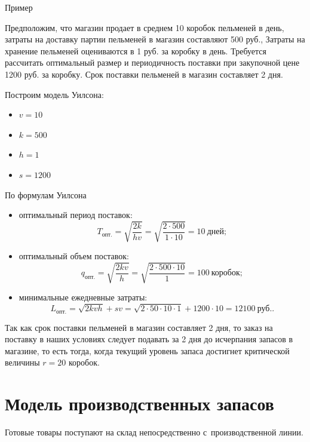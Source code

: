 \documentclass[unicode,11pt,notheorems,xcolor=table]{beamer}
\begin{document}
\begin{frame}[allowframebreaks]{Пример}
    \begin{exampleblock}{}
    Предположим, что магазин продает в среднем 10 коробок пельменей в день, затраты на доставку партии пельменей в магазин составляют 500 руб.,
    Затраты на хранение пельменей оцениваются в 1 руб. за коробку в день. 
    Требуется рассчитать оптимальный размер и периодичность поставки при закупочной цене 1200 руб. за коробку. Срок поставки пельменей в магазин составляет 2 дня.
    \end{exampleblock}

    Построим модель Уилсона:
    \begin{itemize}
        \item $v=10$
        \item $k=500$
        \item $h=1$
        \item $s=1200$
    \end{itemize}
    
    \framebreak
    По формулам Уилсона
    \begin{itemize}
        \item оптимальный период поставок:  
        $$
            T_\text{опт.} 
            = \sqrt{ \dfrac{2k}{hv}}
            = \sqrt{\frac{2\cdot 500}{1\cdot 10}}
            = 10\:\text{дней};
        $$
        \item оптимальный объем поставок:  
        $$
            q_\text{опт.} 
            = \sqrt{ \frac{2kv}{h}} 
            = \sqrt{ \frac{2\cdot 500 \cdot 10}{1}} 
            = 100\:\text{коробок};
        $$
        \item минимальные ежедневные затраты: 
        $$
          L_\text{опт.} =  \sqrt{2kvh} + sv = \sqrt{2\cdot 50\cdot 10\cdot 1}+1200\cdot 10 = 12100\:\text{руб.}.
        $$
    \end{itemize}    
    
    \framebreak
    Так как срок поставки пельменей в магазин составляет 2 дня, то заказ на поставку в наших условиях следует подавать за 2 дня до исчерпания запасов в магазине, то есть тогда, когда текущий уровень запаса достигнет критической величины $r=20$ коробок.
\end{frame}

\section{Модель производственных запасов}
\begin{frame}{}
    \begin{block}{}
        \centering \LARGE {}\par
    \end{block}
    
    Готовые товары поступают на склад непосредственно с~производственной линии. 
\end{frame}
\end{document}
